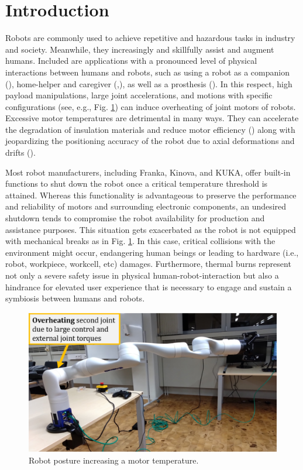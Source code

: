 \documentclass{ifacconf}
\begin{document}
\section{Introduction}
Robots are commonly used to  achieve repetitive and hazardous tasks in industry and society. Meanwhile, they increasingly and skillfully assist and augment humans. Included are  applications with a pronounced level of physical interactions between humans and robots, such as using a robot as a companion (\cite{basha2025robotic}), home-helper and caregiver (\cite{tsui2025exploring},\cite{gkiolnta2025challenges}), as well as a prosthesis (\cite{kim2025mode}). In this respect, high payload manipulations, large joint accelerations, and motions with specific configurations (see, e.g., Fig. \ref{fig:intro}) can induce overheating of joint motors of robots. Excessive motor temperatures are detrimental in many ways. They can accelerate the degradation of insulation materials and reduce motor efficiency (\cite{yehorov2025study}) along with jeopardizing the positioning accuracy of the robot due to axial  deformations and drifts (\cite{soga2024skillful}). 



Most robot manufacturers, including Franka, Kinova, and KUKA, offer built-in functions to shut down the robot once a critical temperature threshold is attained. Whereas this functionality is advantageous to preserve the performance and reliability of motors and surrounding electronic components, an undesired shutdown tends to compromise the robot availability for production and assistance purposes. This situation gets exacerbated as the robot is not equipped with mechanical breaks as in Fig. \ref{fig:intro}. In this case, critical collisions with the environment might occur, endangering human beings or leading to hardware (i.e., robot, workpiece, workcell, etc) damages. Furthermore, thermal burns represent  not only  a severe safety issue in physical human-robot-interaction but also a hindrance for elevated user experience that is necessary to engage and sustain a symbiosis between humans and robots.

\begin{figure}[t]
	\centerline{\includegraphics[width=0.9\columnwidth]{pictures/intro_zoomed.png}}
	\caption{Robot posture increasing a motor temperature.}
	\label{fig:intro}
\end{figure}
\end{document}
